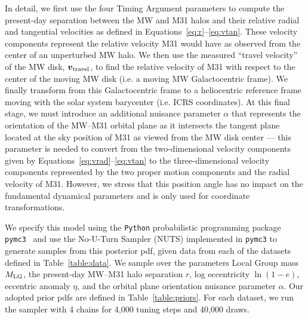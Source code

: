 \documentclass[twocolumn]{aastex631}
\newcommand{\mlg}{\ensuremath{M_{\rm LG}}}
\newcommand{\bov}{\ensuremath{\boldsymbol{v}}}
\newcommand{\vtrav}{\ensuremath{\bov_{\rm travel}}}
\begin{document}
In detail, we first use the four Timing Argument parameters to compute the
present-day separation between the MW and M31 halos and their relative radial
and tangential velocities as defined in Equations~\ref{eq:r}--\ref{eq:vtan}.
These velocity components represent the relative velocity M31 would have as
observed from the center of an unperturbed MW halo.
We then use the measured ``travel velocity'' of the MW disk,
\vtrav, to find the relative velocity of M31 with respect to the center of the
moving MW disk (i.e. a moving MW Galactocentric frame).
We finally transform from this Galactocentric frame to a heliocentric
reference frame moving with the solar system barycenter (i.e. ICRS coordinates).
At this final stage, we must introduce an additional nuisance parameter $\alpha$
that represents the orientation of the MW--M31 orbital plane as it intersects
the tangent plane located at the sky position of M31 as viewed from the MW disk
center --- this parameter is needed to convert from the two-dimensional velocity
components given by Equations~\ref{eq:vrad}--\ref{eq:vtan} to the
three-dimensional velocity components represented by the two proper motion
components and the radial velocity of M31.
However, we stress that this position angle has no impact on the fundamental
dynamical parameters and is only used for coordinate transformations.

We specify this model using the \texttt{Python} probabilistic programming
package \texttt{pymc3}~\citep{Salvatier2016} and use the No-U-Turn Sampler
(NUTS) \citep{Homan2014} implemented in \texttt{pymc3} to generate samples from
this posterior pdf, given data from each of the datasets defined in
Table~\ref{table:data}.
We sample over the parameters Local Group mass $\mlg$, the present-day MW--M31
halo separation $r$, log eccentricity $\ln\left(1 - e\right)$, eccentric anomaly
$\eta$, and the orbital plane orientation nuisance parameter $\alpha$.
Our adopted prior pdfs are defined in Table~\ref{table:priors}.
For each dataset, we run the sampler with 4 chains for 4,000 tuning steps and
40,000 draws.
\end{document}
